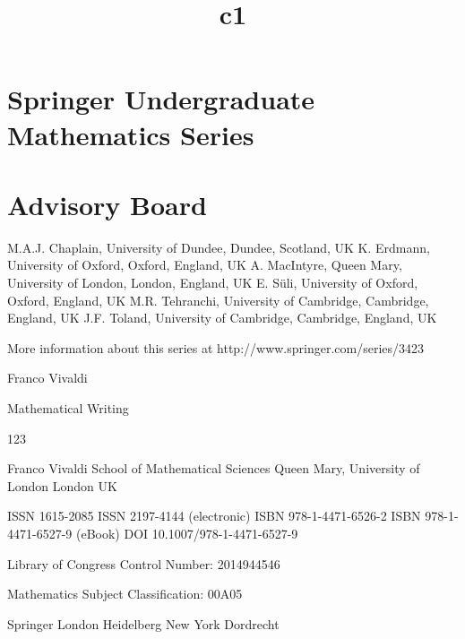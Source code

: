 \documentclass[11pt]{article}
\title{c1}
\date{}
\theoremstyle{plain}
\theoremstyle{definition}
\begin{document}
\maketitle

\section{Springer Undergraduate Mathematics Series}

\section{Advisory Board}

M.A.J. Chaplain, University of Dundee, Dundee, Scotland, UK K. Erdmann, University of Oxford, Oxford, England, UK A. MacIntyre, Queen Mary, University of London, London, England, UK E. Süli, University of Oxford, Oxford, England, UK M.R. Tehranchi, University of Cambridge, Cambridge, England, UK J.F. Toland, University of Cambridge, Cambridge, England, UK

More information about this series at http://www.springer.com/series/3423

Franco Vivaldi

Mathematical Writing

123

Franco Vivaldi School of Mathematical Sciences Queen Mary, University of London London UK

ISSN 1615-2085 ISSN 2197-4144 (electronic) ISBN 978-1-4471-6526-2 ISBN 978-1-4471-6527-9 (eBook) DOI 10.1007/978-1-4471-6527-9

Library of Congress Control Number: 2014944546

Mathematics Subject Classification: 00A05

Springer London Heidelberg New York Dordrecht
\end{document}
